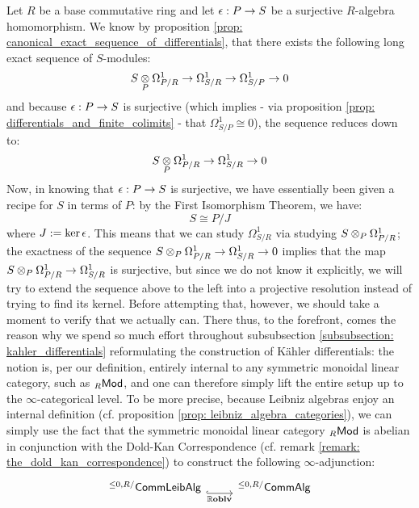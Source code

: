                 \begin{remark} \label{remark: constructing_cotangent_complexes}
                    Let $R$ be a base commutative ring and let $\e: P \to S$ be a surjective $R$-algebra homomorphism. We know by proposition \ref{prop: canonical_exact_sequence_of_differentials}, that there exists the following long exact sequence of $S$-modules:
                        $$S \tensor_P \Omega^1_{P/R} \to \Omega^1_{S/R} \to \Omega^1_{S/P} \to 0$$
                    and because $\e: P \to S$ is surjective (which implies - via proposition \ref{prop: differentials_and_finite_colimits} - that $\Omega^1_{S/P} \cong 0$), the sequence reduces down to:
                        $$S \tensor_P \Omega^1_{P/R} \to \Omega^1_{S/R} \to 0$$
                    Now, in knowing that $\e: P \to S$ is surjective, we have essentially been given a recipe for $S$ in terms of $P$: by the First Isomorphism Theorem, we have:
                        $$S \cong P/J$$
                    where $J := \ker \e$. This means that we can study $\Omega^1_{S/R}$ via studying $S \tensor_P \Omega^1_{P/R}$; the exactness of the sequence $S \tensor_P \Omega^1_{P/R} \to \Omega^1_{S/R} \to 0$ implies that the map $S \tensor_P \Omega^1_{P/R} \to \Omega^1_{S/R}$ is surjective, but since we do not know it explicitly, we will try to extend the sequence above to the left into a projective resolution instead of trying to find its kernel. Before attempting that, however, we should take a moment to verify that we actually can. There thus, to the forefront, comes the reason why we spend so much effort throughout subsubsection \ref{subsubsection: kahler_differentials} reformulating the construction of K\"ahler differentials: the notion is, per our definition, entirely internal to any symmetric monoidal linear category, such as ${}_R\Mod$, and one can therefore simply lift the entire setup up to the $\infty$-categorical level. To be more precise, because Leibniz algebras enjoy an internal definition (cf. proposition \ref{prop: leibniz_algebra_categories}), we can simply use the fact that the symmetric monoidal linear category ${}_R\Mod$ is abelian in conjunction with the Dold-Kan Correspondence (cf. remark \ref{remark: the_dold_kan_correspondence}) to construct the following $\infty$-adjunction:
                        $$
                            \begin{tikzcd}
                            	{{}^{\leq0, R/}\Comm\Leib\Alg} & {{}^{\leq0, R/}\Comm\Alg}
                            	\arrow[""{name=0, anchor=center, inner sep=0}, "\R\oblv"', shift right=2, hook, from=1-1, to=1-2]

\end{tikzcd}$$
\end{remark}
